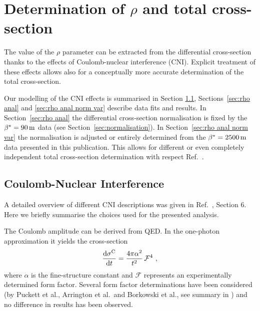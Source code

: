 \section{Determination of $\rho$ and total cross-section}
\label{sec:rho}

The value of the $\rho$ parameter can be extracted from the differential cross-section thanks to the effects of Coulomb-nuclear interference (CNI). Explicit treatment of these effects allows also for a conceptually more accurate determination of the total cross-section. 


Our modelling of the CNI effects is summarised in Section \ref{sec:rho cni}, Sections~\ref{sec:rho anal} and \ref{sec:rho anal norm var} describe data fits and results. In Section~\ref{sec:rho anal} the differential cross-section normalisation is fixed by the $\beta^* = 90\,{\rm m}$ data \cite{totem-13tev-90m} (see Section~\ref{sec:normalisation}). In Section~\ref{sec:rho anal norm var} the normalisation is adjusted or entirely determined from the $\beta^* = 2500\,{\rm m}$ data presented in this publication. This allows for different or even completely independent total cross-section determination with respect Ref.~\cite{totem-13tev-90m}.

\subsection{Coulomb-Nuclear Interference}
\label{sec:rho cni}

A detailed overview of different CNI descriptions was given in Ref.~\cite{totem-8tev-1km}, Section 6. Here we briefly summarise the choices used for the presented analysis.

The Coulomb amplitude can be derived from QED. In the one-photon approximation it yields the cross-section
\begin{equation}
\label{eq:coul cs}
	{{\rm d}\sigma^{\rm C}\over {\rm d}t} = {4\pi\alpha^2\over t^2}\,{\mathcal{F}}^4\ ,
\end{equation}
where $\alpha$ is the fine-structure constant and $\mathcal{F}$ represents an experimentally determined form factor. Several form factor determinations have been considered (by Puckett et al., Arrington et al.~and Borkowski et al., see summary in \cite{elegent}) and no difference in results has been observed.

